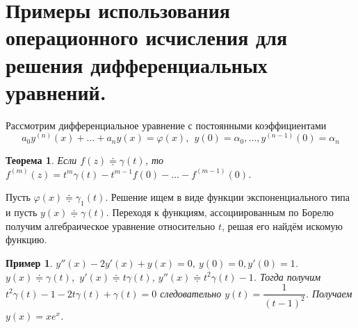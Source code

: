 \documentclass[9pt]{article}
\newtheorem{theorem}{Теорема} %
\newtheorem{example}{Пример} %
\begin{document}
		\section{Примеры использования операционного исчисления для решения дифференциальных уравнений.}
		Рассмотрим дифференциальное уравнение с постоянными коэффициентами
		$$
		a_0 y^{(n)}(x) + \dots + a_ny(x) = \varphi(x), \ \ y(0) = \alpha_0, \dots , y^{(n-1)}(0) = \alpha_n
		$$
		\begin{theorem}
			Если $f(z) \doteqdot \gamma(t)$, то $f^{(m)}(z) = t^m \gamma(t) - t^{m-1} f(0) - \dots - f^{(m-1)}(0)$.
		\end{theorem}
		Пусть $\varphi(x) \doteqdot \gamma_1(t)$. Решение ищем в виде функции экспоненциального типа и пусть $y(x) \doteqdot \gamma(t)$. Переходя к функциям, ассоциированным по Борелю получим алгебраическое уравнение относительно $t$, решая его найдём искомую функцию.
		\begin{example}
			$y''(x) -2y'(x)+y(x) = 0, \ y(0) = 0, y'(0) = 1$. \newline $y(x) \doteqdot \gamma(t)$,\ $y'(x) \doteqdot t \gamma(t)$, $y''(x) \doteqdot t^2 \gamma(t) -1$. Тогда получим\newline
			$t^2 \gamma(t) - 1 - 2t\gamma(t) + \gamma(t) = 0$ следовательно $y(t) = \dfrac{1}{(t-1)^2}$. Получаем $y(x) = xe^x$.
		\end{example}
\end{document}
